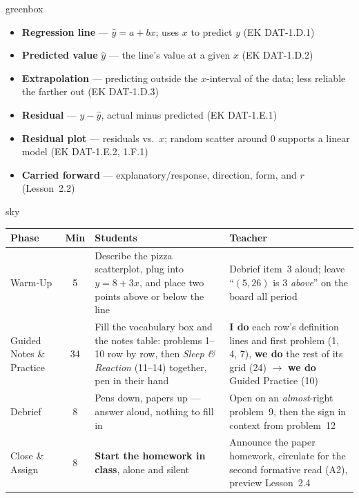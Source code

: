 \documentclass[10pt]{article}
\begin{document}
\boxguard
\begin{skillbox}{greenbox}
\begin{minipage}[t]{0.48\linewidth}
    \begin{itemize}
        \item \textbf{Regression line} --- $\hat{y} = a + bx$; uses $x$ to predict $y$
              (EK DAT-1.D.1)
        \item \textbf{Predicted value} $\hat{y}$ --- the line's value at a given $x$
              (EK DAT-1.D.2)
        \item \textbf{Extrapolation} --- predicting outside the $x$-interval of the data;
              less reliable the farther out (EK DAT-1.D.3)
    \end{itemize}
\end{minipage}
\hfill
\begin{minipage}[t]{0.48\linewidth}
    \begin{itemize}
        \item \textbf{Residual} --- $y - \hat{y}$, actual minus predicted (EK DAT-1.E.1)
        \item \textbf{Residual plot} --- residuals vs.\ $x$; random scatter around 0 supports
              a linear model (EK DAT-1.E.2, 1.F.1)
        \item \textbf{Carried forward} --- explanatory/response, direction, form, and $r$
              (Lesson~2.2)
    \end{itemize}
\end{minipage}
\end{skillbox}

\boxguard[30]
\begin{skillbox}{sky}
\renewcommand{\arraystretch}{1.25}
\begin{tabularx}{\linewidth}{@{}l c X X@{}}
\textbf{Phase} & \textbf{Min} & \textbf{Students} & \textbf{Teacher} \\
\hline
Warm-Up & 5 & Describe the pizza scatterplot, plug into $y = 8 + 3x$, and place two points above or below the line & Debrief item~3 aloud; leave ``$(5,26)$ is 3 \emph{above}'' on the board all period \\
Guided Notes \& Practice & 34 & Fill the vocabulary box and the notes table: problems 1--10 row by row, then \emph{Sleep \& Reaction} (11--14) together, pen in their hand & \textbf{I do} each row's definition lines and first problem (1, 4, 7), \textbf{we do} the rest of its grid (24) $\to$ \textbf{we do} Guided Practice (10) \\
Debrief & 8 & Pens down, papers up --- answer aloud, nothing to fill in & Open on an \emph{almost}-right problem~9, then the sign in context from problem~12 \\
Close \& Assign & 8 & \textbf{Start the homework in class}, alone and silent & Announce the paper homework, circulate for the second formative read (A2), preview Lesson~2.4 \\
\end{tabularx}
\end{skillbox}
\end{document}
